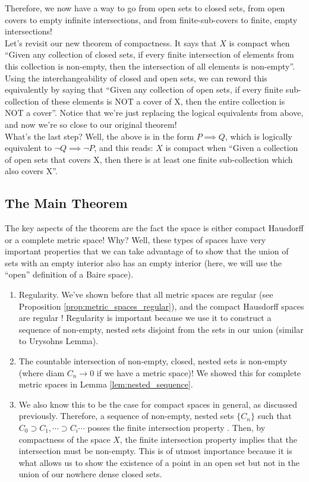 \documentclass[english, 11pt]{article}
\begin{document}
  Therefore, we now have a way to go from open sets to closed sets, from open covers to empty infinite intersections, and from finite-sub-covers to finite, empty intersections!\\

  Let's revisit our new theorem of compactness. It says that $X$ is compact when ``Given any collection of closed sets, if every finite intersection of elements from this collection is non-empty, then the intersection of all elements is non-empty''. Using the interchangeability of closed and open sets, we can reword this equivalently by saying that ``Given any collection of open sets, if every finite sub-collection of these elements is NOT a cover of X, then the entire collection is NOT a cover''. Notice that we're just replacing the logical equivalents from above, and now we're so close to our original theorem!\\

  What's the last step? Well, the above is in the form $P \implies Q$, which is logically equivalent to $\lnot Q \implies \lnot P$, and this reads: $X$ is compact when ``Given a collection of open sets that covers X, then there is at least one finite sub-collection which also covers X''.\\

  \subsection{The Main Theorem}

  The key aspects of the theorem are the fact the space is either compact Hausdorff or a complete metric space! Why? Well, these types of spaces have very important properties that we can take advantage of to show that the union of sets with an empty interior also has an empty interior (here, we will use the ``open'' definition of a Baire space).
  \begin{enumerate}
    \item Regularity. We've shown before that all metric spaces are regular (see Proposition \ref{prop:metric_spaces_regular}), and the compact Hausdorff spaces are regular \cite{hausdorff_regular}! Regularity is important because we use it to construct a sequence of non-empty, nested sets disjoint from the sets in our union (similar to Urysohns Lemma).
    \item The countable intersection of non-empty, closed, nested sets is non-empty (where diam $C_n \to 0$ if we have a metric space)! We showed this for complete metric spaces in Lemma \ref{lem:nested_sequence}.
    \item We also know this to be the case for compact spaces in general, as discussed previously. Therefore, a sequence of non-empty, nested sets $\{C_n\}$ such that $C_0 \supset C_1, \cdots \supset C_i \cdots$ posses the finite intersection property \cite{finite_intersection}. Then, by compactness of the space $X$, the finite intersection property implies that the intersection must be non-empty. This is of utmost importance because it is what allows us to show the existence of a point in an open set but not in the union of our nowhere dense closed sets.
  \end{enumerate}
\end{document}

